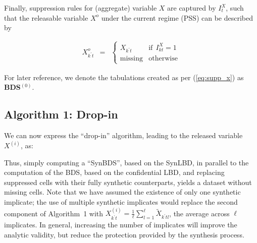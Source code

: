 Finally, suppression rules for (aggregate) variable $X$ are captured by $I_{t}^X$, such that the 
releasable variable $X^o$  under the current regime (PSS) can be described by

\begin{eqnarray}
\label{eq:supp_x}
X_{k^\prime t}^o &=& \left \lbrace 
\begin{array}{rl}
X_{k^\prime t} &\mbox{if}~~  I_{kt}^X = 1 \\
\mbox{missing} &\mbox{otherwise}
\end{array} \right .
\end{eqnarray}

For later 
reference, we denote the tabulations created as per (\ref{eq:supp_x}) as \textbf{BDS$^{(0)}$}.

\subsection{Algorithm 1: Drop-in}

We can now express the ``drop-in'' algorithm, leading to the released variable $X^{(i)}$, as:
\begin{algorithm}
\label{alg1n}
\begin{algorithmic}
\Else
\EndIf
\end{algorithmic}
\end{algorithm}

Thus, simply computing a ``SynBDS'', based on the \ac{SynLBD}, in parallel to the computation 
of the \ac{BDS}, based on the confidential \ac{LBD}, and replacing suppressed cells with their 
fully synthetic counterparts, yields a dataset without missing cells. Note that we have assumed 
the existence of only one synthetic implicate; the use of multiple synthetic implicates would 
replace the second component of Algorithm~1 with  
$X_{k^\prime t}^{(i)} = \frac{1}{\ell} \sum_{l=1}^{\ell} \tilde{X}_{k^\prime t l} $, the average across 
$\ell$ 
implicates. In 
general, increasing the number of implicates will improve the analytic validity, but reduce the 
protection provided by the synthesis process. 


